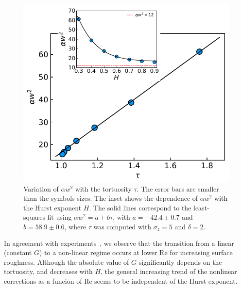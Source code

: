\documentclass[aps,pre,
superscriptaddress,
twocolumn,
notitlepage,
10pt,
]{revtex4-1}
\begin{document}
\begin{figure} %
	\centering %
	\includegraphics[width=0.99\columnwidth]{fig3.pdf} \caption{Variation of
		$\alpha w^2$ with the tortuosity $\tau$. The error bars are smaller than the
		symbols sizes. The inset shows the dependence of $\alpha w^2$ with the Hurst
		exponent $H$. The solid lines correspond to the least-squares fit using
		$\alpha
		w^2=a + b \tau$, with $a=-42.4\pm0.7$ and $b=58.9\pm0.6$, where $\tau$ was
		computed with $\sigma_z=5$ and $\delta = 2$.}\label{fig3} %
\end{figure}

In agreement with experiments~\cite{Chen2017a}, we observe that the transition
from a linear (constant $G$) to a non-linear regime occurs at lower
$\mathrm{Re}$ for increasing surface roughness. Although the absolute value of 
$G$ significantly depends on the tortuosity, and decreases with $H$, the general
increasing trend of the nonlinear corrections as a funcion of $\mathrm{Re}$
seems to be independent of the Hurst exponent.
\end{document}
